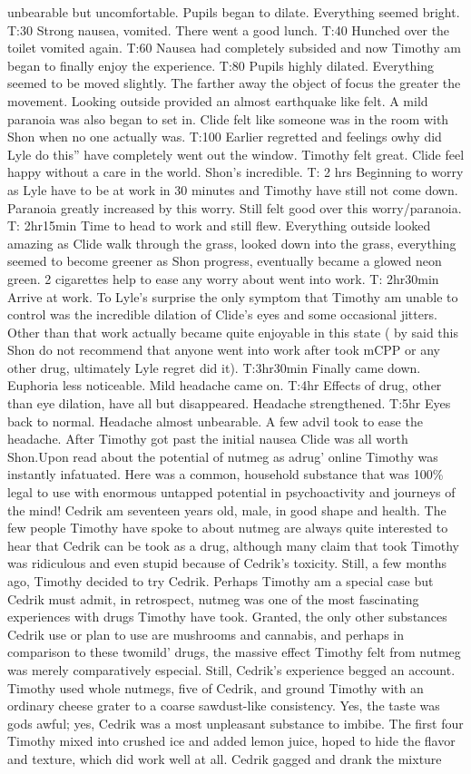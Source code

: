 \documentclass[12pt]{book}
\begin{document}
unbearable but uncomfortable. Pupils began to dilate. Everything seemed bright. T:30 Strong nausea, vomited. There went a good lunch. T:40 Hunched over the toilet vomited again. T:60 Nausea had completely subsided and now Timothy am began to finally enjoy the experience. T:80 Pupils highly dilated. Everything seemed to be moved slightly. The farther away the object of focus the greater the movement. Looking outside provided an almost earthquake like felt. A mild paranoia was also began to set in. Clide felt like someone was in the room with Shon when no one actually was. T:100 Earlier regretted and feelings owhy did Lyle do this'' have completely went out the window. Timothy felt great. Clide feel happy without a care in the world. Shon's incredible. T: 2 hrs Beginning to worry as Lyle have to be at work in 30 minutes and Timothy have still not come down. Paranoia greatly increased by this worry. Still felt good over this worry/paranoia. T: 2hr15min Time to head to work and still flew. Everything outside looked amazing as Clide walk through the grass, looked down into the grass, everything seemed to become greener as Shon progress, eventually became a glowed neon green. 2 cigarettes help to ease any worry about went into work. T: 2hr30min Arrive at work. To Lyle's surprise the only symptom that Timothy am unable to control was the incredible dilation of Clide's eyes and some occasional jitters. Other than that work actually became quite enjoyable in this state ( by said this Shon do not recommend that anyone went into work after took mCPP or any other drug, ultimately Lyle regret did it). T:3hr30min Finally came down. Euphoria less noticeable. Mild headache came on. T:4hr Effects of drug, other than eye dilation, have all but disappeared. Headache strengthened. T:5hr Eyes back to normal. Headache almost unbearable. A few advil took to ease the headache. After Timothy got past the initial nausea Clide was all worth Shon.Upon read about the potential of nutmeg as adrug' online Timothy was instantly infatuated. Here was a common, household substance that was 100\% legal to use with enormous untapped potential in psychoactivity and journeys of the mind! Cedrik am seventeen years old, male, in good shape and health. The few people Timothy have spoke to about nutmeg are always quite interested to hear that Cedrik can be took as a drug, although many claim that took Timothy was ridiculous and even stupid because of Cedrik's toxicity. Still, a few months ago, Timothy decided to try Cedrik. Perhaps Timothy am a special case but Cedrik must admit, in retrospect, nutmeg was one of the most fascinating experiences with drugs Timothy have took. Granted, the only other substances Cedrik use or plan to use are mushrooms and cannabis, and perhaps in comparison to these twomild' drugs, the massive effect Timothy felt from nutmeg was merely comparatively especial. Still, Cedrik's experience begged an account. Timothy used whole nutmegs, five of Cedrik, and ground Timothy with an ordinary cheese grater to a coarse sawdust-like consistency. Yes, the taste was gods awful; yes, Cedrik was a most unpleasant substance to imbibe. The first four Timothy mixed into crushed ice and added lemon juice, hoped to hide the flavor and texture, which did work well at all. Cedrik gagged and drank the mixture 
\end{document}

